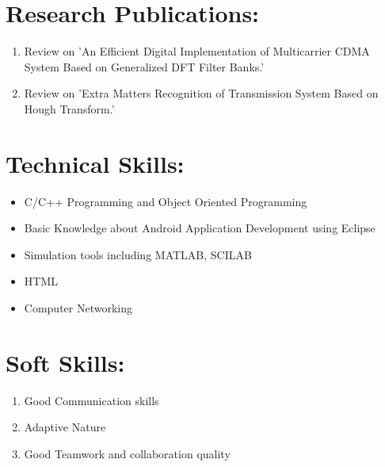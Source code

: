\documentclass[a4 paper,12pt]{article}
\begin{document}
\begin{minipage}{0.98\textwidth}
	\section{Research Publications:}
	\begin{enumerate}
		\vspace{-0.1in}
		\item Review on 'An Efficient Digital Implementation of
		Multicarrier CDMA System Based on Generalized DFT Filter Banks.'
		\item Review on 'Extra Matters Recognition of Transmission System Based on Hough Transform.'
	\end{enumerate}
\end{minipage}

\begin{minipage}{0.98\textwidth}
	\section{Technical Skills:}
	\begin{itemize}
		\vspace{-0.1in}
		\item C/C++ Programming and Object Oriented Programming
		\item Basic Knowledge about Android Application Development using Eclipse
		\item Simulation tools including MATLAB, SCILAB
		\item HTML
		\item Computer Networking
	\end{itemize}

\section{Soft Skills:}
\begin{enumerate}
	\vspace{-0.1in}
	\item Good Communication skills
	\item Adaptive Nature
	\item Good Teamwork and collaboration quality
\end{enumerate}


\end{minipage}
\end{document}
